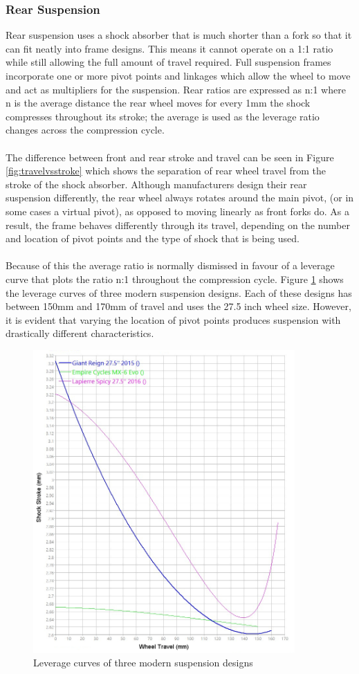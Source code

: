 	\subsubsection{Rear Suspension}\label{sec:lit_review_rear_suspension}
		Rear suspension uses a shock absorber that is much shorter than a fork so that it can fit neatly into frame designs. This means it cannot operate on a 1:1 ratio while still allowing the full amount of travel required. Full suspension frames incorporate one or more pivot points and linkages which allow the wheel to move and act as multipliers for the suspension. Rear ratios are expressed as n:1 where n is the average distance the rear wheel moves for every 1mm the shock compresses throughout its stroke; the average is used as the leverage ratio changes across the compression cycle.
		\\\\
		The difference between front and rear stroke and travel can be seen in Figure \ref{fig:travelvsstroke} which shows the separation of rear wheel travel from the stroke of the shock absorber. Although manufacturers design their rear suspension differently, the rear wheel always rotates around the main pivot, (or in some cases a virtual pivot), as opposed to moving linearly as front forks do. As a result, the frame behaves differently through its travel, depending on the number and location of pivot points and the type of shock that is being used. 
		\\\\
		Because of this the average ratio is normally dismissed in favour of a leverage curve that plots the ratio n:1 throughout the compression cycle. Figure \ref{fig:3_bike_lev_ratio} shows the leverage curves of three modern suspension designs. Each of these designs has between 150mm and 170mm of travel and uses the 27.5 inch wheel size. However, it is evident that varying the location of pivot points produces suspension with drastically different characteristics.
		\begin{figure}[h!]
			\centering
			\includegraphics[width=10cm]{../images/3_bike_lev_ratio.jpg}
			\caption{Leverage curves of three modern suspension designs}
			\label{fig:3_bike_lev_ratio}
		\end{figure}
